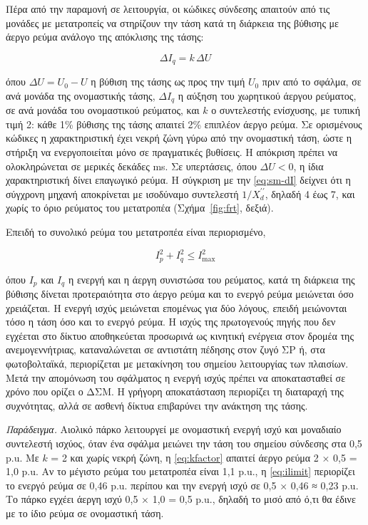 Πέρα από την παραμονή σε λειτουργία, οι κώδικες σύνδεσης απαιτούν από τις μονάδες με
μετατροπείς να στηρίζουν την τάση κατά τη διάρκεια της βύθισης με άεργο ρεύμα ανάλογο της
απόκλισης της τάσης:

\begin{equation}
\Delta I_q = k\,\Delta U
\label{eq:kfactor}
\end{equation}

όπου $\Delta U = U_0 - U$ η βύθιση της τάσης ως προς την τιμή $U_0$ πριν από το σφάλμα, σε ανά
μονάδα της ονομαστικής τάσης, $\Delta I_q$ η αύξηση του χωρητικού άεργου ρεύματος, σε ανά
μονάδα του ονομαστικού ρεύματος, και $k$ ο συντελεστής ενίσχυσης, με τυπική τιμή 2: κάθε 1\%
βύθισης της τάσης απαιτεί 2\% επιπλέον άεργο ρεύμα. Σε ορισμένους κώδικες η χαρακτηριστική
έχει νεκρή ζώνη γύρω από την ονομαστική τάση, ώστε η στήριξη να ενεργοποιείται μόνο σε
πραγματικές βυθίσεις. Η απόκριση πρέπει να ολοκληρώνεται σε μερικές δεκάδες ms. Σε υπερτάσεις,
όπου $\Delta U < 0$, η ίδια χαρακτηριστική δίνει επαγωγικό ρεύμα. Η σύγκριση με την
\eqref{eq:sm-dI} δείχνει ότι η σύγχρονη μηχανή αποκρίνεται με ισοδύναμο συντελεστή $1/X_d^{\prime\prime}$,
δηλαδή 4 έως 7, και χωρίς το όριο ρεύματος του μετατροπέα (Σχήμα~\ref{fig:frt}, δεξιά).

Επειδή το συνολικό ρεύμα του μετατροπέα είναι περιορισμένο,

\begin{equation}
I_p^2 + I_q^2 \le I_{\max}^2
\label{eq:ilimit}
\end{equation}

όπου $I_p$ και $I_q$ η ενεργή και η άεργη συνιστώσα του ρεύματος, κατά τη διάρκεια της βύθισης
δίνεται προτεραιότητα στο άεργο ρεύμα και το ενεργό ρεύμα μειώνεται όσο χρειάζεται. Η ενεργή
ισχύς μειώνεται επομένως για δύο λόγους, επειδή μειώνονται τόσο η τάση όσο και το ενεργό
ρεύμα. Η ισχύς της πρωτογενούς πηγής που δεν εγχέεται στο δίκτυο αποθηκεύεται προσωρινά ως
κινητική ενέργεια στον δρομέα της ανεμογεννήτριας, καταναλώνεται σε αντιστάτη πέδησης στον ζυγό
ΣΡ ή, στα φωτοβολταϊκά, περιορίζεται με μετακίνηση του σημείου λειτουργίας των πλαισίων. Μετά
την απομόνωση του σφάλματος η ενεργή ισχύς πρέπει να αποκατασταθεί σε χρόνο που ορίζει ο ΔΣΜ.
Η γρήγορη αποκατάσταση περιορίζει τη διαταραχή της συχνότητας, αλλά σε ασθενή δίκτυα
επιβαρύνει την ανάκτηση της τάσης.

\emph{Παράδειγμα.} Αιολικό πάρκο λειτουργεί με ονομαστική ενεργή ισχύ και μοναδιαίο συντελεστή
ισχύος, όταν ένα σφάλμα μειώνει την τάση του σημείου σύνδεσης στα 0,5 p.u. Με $k$ = 2 και
χωρίς νεκρή ζώνη, η \eqref{eq:kfactor} απαιτεί άεργο ρεύμα 2 × 0,5 = 1,0 p.u. Αν το μέγιστο
ρεύμα του μετατροπέα είναι 1,1 p.u., η \eqref{eq:ilimit} περιορίζει το ενεργό ρεύμα σε 0,46
p.u. περίπου και την ενεργή ισχύ σε 0,5 × 0,46 ≈ 0,23 p.u. Το πάρκο εγχέει άεργη ισχύ
0,5 × 1,0 = 0,5 p.u., δηλαδή το μισό από ό,τι θα έδινε με το ίδιο ρεύμα σε ονομαστική τάση.

